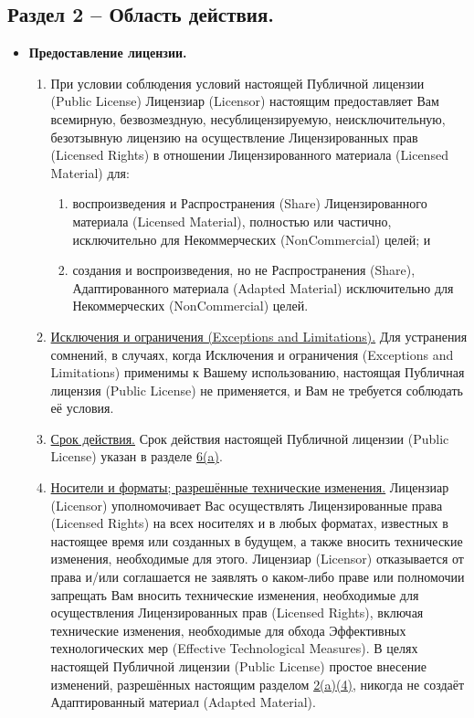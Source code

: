 \subsection*{Раздел 2 -- Область действия.}
\begin{itemize}
\item[a.] \textbf{Предоставление лицензии.}
	\begin{enumerate}
	\item При условии соблюдения условий настоящей Публичной лицензии (Public License) Лицензиар (Licensor) настоящим предоставляет Вам всемирную, безвозмездную, несублицензируемую, неисключительную, безотзывную лицензию на осуществление Лицензированных прав (Licensed Rights) в отношении Лицензированного материала (Licensed Material) для:
	\begin{enumerate}
		\item[A.] воспроизведения и Распространения (Share) Лицензированного материала (Licensed Material), полностью или частично, исключительно для Некоммерческих (NonCommercial) целей; и
		\item[B.] создания и воспроизведения, но не Распространения (Share), Адаптированного материала (Adapted Material) исключительно для Некоммерческих (NonCommercial) целей.
	\end{enumerate}
	\item \underline{Исключения и ограничения (Exceptions and Limitations).} Для устранения сомнений, в случаях, когда Исключения и ограничения (Exceptions and Limitations) применимы к Вашему использованию, настоящая Публичная лицензия (Public License) не применяется, и Вам не требуется соблюдать её условия.
	\item \underline{Срок действия.} Срок действия настоящей Публичной лицензии (Public License) указан в разделе \href{https://creativecommons.org/licenses/by-nc-nd/4.0/legalcode#s6a}{6(a)}.
	\item \underline{Носители и форматы; разрешённые технические изменения.} Лицензиар (Licensor) уполномочивает Вас осуществлять Лицензированные права (Licensed Rights) на всех носителях и в любых форматах, известных в настоящее время или созданных в будущем, а также вносить технические изменения, необходимые для этого. Лицензиар (Licensor) отказывается от права и/или соглашается не заявлять о каком-либо праве или полномочии запрещать Вам вносить технические изменения, необходимые для осуществления Лицензированных прав (Licensed Rights), включая технические изменения, необходимые для обхода Эффективных технологических мер (Effective Technological Measures). В целях настоящей Публичной лицензии (Public License) простое внесение изменений, разрешённых настоящим разделом \href{https://creativecommons.org/licenses/by-nc-nd/4.0/legalcode#s2a4}{2(a)(4)}, никогда не создаёт Адаптированный материал (Adapted Material).

\end{enumerate}
\end{itemize}

